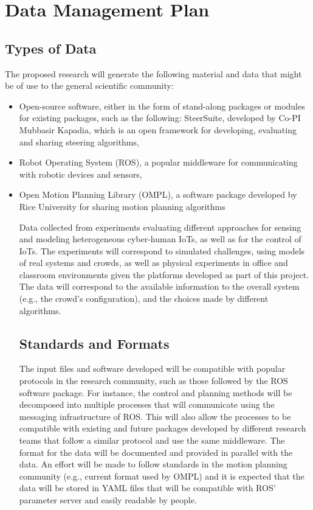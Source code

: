 \section{Data Management Plan}

\subsection{Types of Data} 
The proposed research will generate the following material and data that might be of use to the general scientific community: 
\begin{itemize}
\item Open-source software, either in the form of stand-along packages or modules for existing packages, such as the following: 
	SteerSuite, developed by Co-PI Mubbasir Kapadia, which is an open framework for developing, evaluating and sharing steering algorithms,
\item Robot Operating System (ROS), a popular middleware for communicating with robotic devices and sensors, 
\item Open Motion Planning Library (OMPL), a software package developed by Rice University for sharing motion planning algorithms 

Data collected from experiments evaluating different approaches for sensing and modeling heterogeneous cyber-human IoTs, as well as for the control of IoTs. The experiments will correspond to simulated challenges, using models of real systems and crowds, as well as physical experiments in office and classroom environments given the platforms developed as part of this project. The data will correspond to the available information to the overall system (e.g., the crowd’s configuration), and the choices made by different algorithms. 

\subsection{Standards and Formats} 
The input files and software developed will be compatible with popular protocols in the research community, such as those followed by the ROS software package. For instance, the control and planning methods will be decomposed into multiple processes that will communicate using the messaging infrastructure of ROS. This will also allow the processes to be compatible with existing and future packages developed by different research teams that follow a similar protocol and use the same middleware. 
The format for the data will be documented and provided in parallel with the data. An effort will be made to follow standards in the motion planning community (e.g., current format used by OMPL) and it is expected that the data will be stored in YAML files that will be compatible with ROS’ parameter server and easily readable by people. 


\end{itemize}
